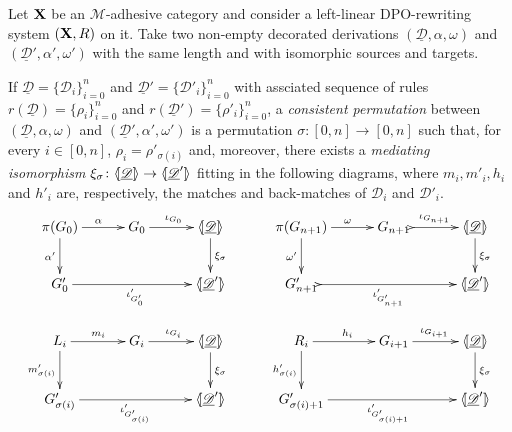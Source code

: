 \documentclass[a4paper,UKenglish,cleveref,pdftex, thm-restate,numberwithinsect]{lipics}
\def\R{\mathsf{R}}
\def\X{\textbf {\textup{X}}}
\newcommand{\dder}[1]{\mathscr{#1}}
\newcommand{\der}[1]{\underline{\dder{#1}}}
\newcommand{\lpro}{\langle \hspace{-1.85pt}[}
\newcommand{\rpro}{]\hspace{-1.85pt}\rangle}
\newcommand{\tpro}[1]{\lpro \der{#1}\rpro}
\begin{document}
\begin{definition}\label{def:permcon}
	Let $\X$ be an $\mathcal{M}$-adhesive category and consider a left-linear DPO-rewriting system $(\X, \R)$ on it.  Take two non-empty decorated derivations $(\der{D}, \alpha, \omega)$ and  $(\der{D}', \alpha', \omega')$ with the same length and with isomorphic sources and targets.
	 	 
	 	If $\der{D}=\{\dder{D}_i\}_{i=0}^n$ and $\der{D}'=\{\dder{D}'_i\}_{i=0}^n$ with assciated sequence of rules $r(\der{D})=\{\rho_i\}_{i=0}^n$ and $r(\der{D}')=\{\rho'_i\}_{i=0}^n$, a \emph{consistent permutation} between  $(\der{D}, \alpha, \omega)$ and $(\der{D}', \alpha', \omega')$ is a permutation $\sigma\colon [0,n]\to [0,n]$  such that, for every $i\in [0,n]$, $\rho_i=\rho'_{\sigma(i)}$ and, moreover, there exists a \emph{mediating isomorphism} $\xi_\sigma\colon \tpro{D} \to \lpro \der{D}' \rpro$ fitting in the following diagrams, where $m_i, m'_i, h_i$ and $h'_i$ are, respectively, the matches and back-matches of $\dder{D}_i$ and $\dder{D}'_i$.
	\[\xymatrix@C=30pt{\pi(G_0)\ar[r]^{\alpha} \ar[d]_{\alpha'} & G_0 \ar[r]^{\iota_{G_0}} &\tpro{D} \ar[d]^{\xi_\sigma}&   \pi(G_{n+1}) \ar[r]^{\omega} \ar[d]_{\omega'} & G_{n+1} \ar@{>->}[r]^{\iota_{G_{n+1}}} &\tpro{D} \ar[d]^{\xi_\sigma}\\ G'_0 \ar[rr]_{\iota'_{G'_0}} & &\lpro \der{D}' \rpro& G'_{n+1} \ar@{>->}[rr]_{\iota'_{G'_{n+1}}} & &\lpro \der{D}' \rpro\\L_i \ar[r]^{m_i} \ar[d]_{m'_{\sigma(i)}}& G_i \ar[r]^{\iota_{G_i}} &\tpro{D} \ar[d]^{\xi_\sigma} & R_i \ar[r]^{h_i} \ar[d]_{h'_{\sigma(i)}}& G_{i+1} \ar[r]^{\iota_{G_{i+1}}} &\tpro{D} \ar[d]^{\xi_\sigma} \\G'_{\sigma(i)} \ar[rr]_{\iota'_{G'_{\sigma(i)}}}&& \lpro \der{D}' \rpro& G'_{\sigma(i)+1} \ar[rr]_{\iota'_{G'_{\sigma(i)+1}}}&& \lpro \der{D}' \rpro}\]
\end{definition}
\end{document}
